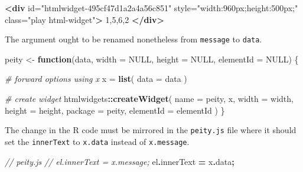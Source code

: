 \documentclass[
]{krantz}
\makeatletter
\newenvironment{Shaded}{\begin{snugshade}}{\end{snugshade}}
\newcommand{\AttributeTok}[1]{\textcolor[rgb]{0.61,0.61,0.61}{#1}}
\newcommand{\CommentTok}[1]{\textcolor[rgb]{0.37,0.37,0.37}{\textit{#1}}}
\newcommand{\ControlFlowTok}[1]{\textcolor[rgb]{0.27,0.27,0.27}{\textbf{#1}}}
\newcommand{\DataTypeTok}[1]{\textcolor[rgb]{0.27,0.27,0.27}{#1}}
\newcommand{\KeywordTok}[1]{\textcolor[rgb]{0.27,0.27,0.27}{\textbf{#1}}}
\newcommand{\NormalTok}[1]{#1}
\newcommand{\OperatorTok}[1]{\textcolor[rgb]{0.43,0.43,0.43}{\textbf{#1}}}
\newcommand{\OtherTok}[1]{\textcolor[rgb]{0.37,0.37,0.37}{#1}}
\newcommand{\StringTok}[1]{\textcolor[rgb]{0.5,0.5,0.5}{#1}}
\newenvironment{kframe}{%
\medskip{}
\setlength{\fboxsep}{.8em}
 \def\at@end@of@kframe{}%
 \ifinner\ifhmode%
  \def\at@end@of@kframe{\end{minipage}}%
  \begin{minipage}{\columnwidth}%
 \fi\fi%
 \def\FrameCommand##1{\hskip\@totalleftmargin \hskip-\fboxsep
 \colorbox{shadecolor}{##1}\hskip-\fboxsep
     \hskip-\linewidth \hskip-\@totalleftmargin \hskip\columnwidth}%
 \MakeFramed {\advance\hsize-\width
   \@totalleftmargin\z@ \linewidth\hsize
   \@setminipage}}%
 {\par\unskip\endMakeFramed%
 \at@end@of@kframe}
\renewenvironment{Shaded}{\begin{kframe}}{\end{kframe}}
\makeatother
\begin{document}
\begin{Shaded}
\begin{Highlighting}[]
\KeywordTok{\textless{}div} 
\OtherTok{  id=}\StringTok{"htmlwidget{-}495cf47d1a2a4a56c851"} 
\OtherTok{  style=}\StringTok{"width:960px;height:500px;"} 
\OtherTok{  class=}\StringTok{"play html{-}widget"}\KeywordTok{\textgreater{}}
\NormalTok{  1,5,6,2}
\KeywordTok{\textless{}/div\textgreater{}}
\end{Highlighting}
\end{Shaded}

The argument ought to be renamed nonetheless from \texttt{message} to \texttt{data}.

\begin{Shaded}
\begin{Highlighting}[]
\NormalTok{peity \textless{}{-}}\StringTok{ }\ControlFlowTok{function}\NormalTok{(data, }\DataTypeTok{width =} \OtherTok{NULL}\NormalTok{, }\DataTypeTok{height =} \OtherTok{NULL}\NormalTok{, }
  \DataTypeTok{elementId =} \OtherTok{NULL}\NormalTok{) \{}

  \CommentTok{\# forward options using x}
\NormalTok{  x =}\StringTok{ }\KeywordTok{list}\NormalTok{(}
    \DataTypeTok{data =}\NormalTok{ data}
\NormalTok{  )}

  \CommentTok{\# create widget}
\NormalTok{  htmlwidgets}\OperatorTok{::}\KeywordTok{createWidget}\NormalTok{(}
    \DataTypeTok{name =} \StringTok{\textquotesingle{}peity\textquotesingle{}}\NormalTok{,}
\NormalTok{    x,}
    \DataTypeTok{width =}\NormalTok{ width,}
    \DataTypeTok{height =}\NormalTok{ height,}
    \DataTypeTok{package =} \StringTok{\textquotesingle{}peity\textquotesingle{}}\NormalTok{,}
    \DataTypeTok{elementId =}\NormalTok{ elementId}
\NormalTok{  )}
\NormalTok{\}}
\end{Highlighting}
\end{Shaded}

The change in the R code must be mirrored in the \texttt{peity.js} file where it should set the \texttt{innerText} to \texttt{x.data} instead of \texttt{x.message}.

\begin{Shaded}
\begin{Highlighting}[]
\CommentTok{// peity.js}
\CommentTok{// el.innerText = x.message;}
\NormalTok{el}\OperatorTok{.}\AttributeTok{innerText} \OperatorTok{=}\NormalTok{ x}\OperatorTok{.}\AttributeTok{data}\OperatorTok{;}
\end{Highlighting}
\end{Shaded}
\end{document}
